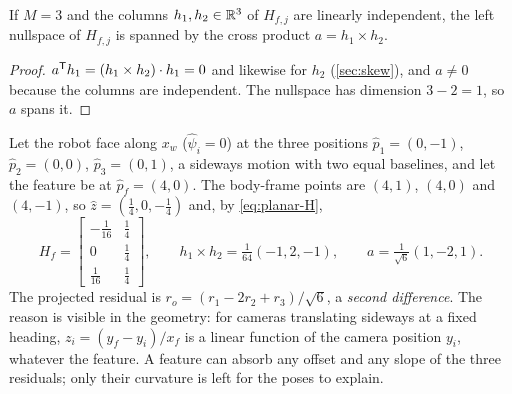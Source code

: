 \begin{proposition}
\label{prop:three-views}
If $M = 3$ and the columns $h_1, h_2 \in \mathbb{R}^3$ of $H_{f,j}$ are linearly independent, the left nullspace of $H_{f,j}$ is spanned by the cross product
$a = h_1\times h_2$.
\end{proposition}
\begin{proof}
$a^{\mathsf{T}} h_1 = (h_1\times h_2)\cdot h_1 = 0$ and likewise for $h_2$ (\cref{sec:skew}), and $a \ne 0$ because the columns are independent. The
nullspace has dimension $3 - 2 = 1$, so $a$ spans it.
\end{proof}

\begin{worked}
Let the robot face along $x_w$ ($\hat\psi_i = 0$) at the three positions $\hat p_1 = (0, -1)$, $\hat p_2 = (0, 0)$, $\hat p_3 = (0, 1)$, a sideways motion with two
equal baselines, and let the feature be at $\hat p_f = (4, 0)$. The body-frame points are $(4, 1)$, $(4, 0)$ and $(4, -1)$, so
$\hat z = (\tfrac14, 0, -\tfrac14)$ and, by \eqref{eq:planar-H},
\begin{equation*}
  H_f = \begin{bmatrix} -\tfrac{1}{16} & \tfrac14 \\ 0 & \tfrac14 \\ \tfrac{1}{16} & \tfrac14 \end{bmatrix}, \qquad
  h_1\times h_2 = \tfrac{1}{64}(-1, 2, -1), \qquad a = \tfrac{1}{\sqrt6}(1, -2, 1).
\end{equation*}
The projected residual is $r_o = (r_1 - 2r_2 + r_3)/\sqrt6$, a \emph{second difference}. The reason is visible in the geometry: for cameras translating
sideways at a fixed heading, $z_i = (y_f - y_i)/x_f$ is a linear function of the camera position $y_i$, whatever the feature. A feature can absorb
any offset and any slope of the three residuals; only their curvature is left for the poses to explain.


\end{worked}
